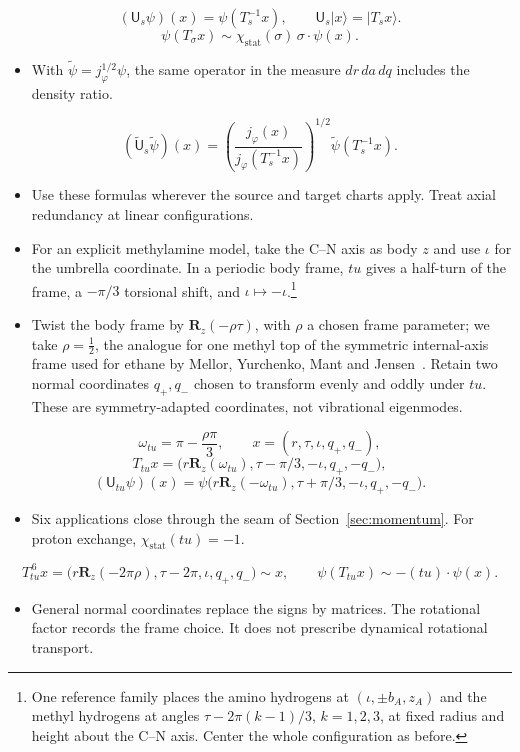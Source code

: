 \documentclass[12pt]{article}
\newcommand{\act}{\mathbin{\cdot}}
\newcommand{\stat}{\chi_{\mathrm{stat}}}
\newcommand{\Rmat}{\mathbf{R}}              %
\newcommand{\Uop}[1]{\mathsf{U}_{#1}}       %
\newcommand{\jdens}{j_\varphi}              %
\begin{document}
\[
(\Uop{s}\psi)(x)=\psi(T_s^{-1}x),\qquad \Uop{s}|x\rangle=|T_sx\rangle.
\]
\[
\psi(T_\sigma x)\sim\stat(\sigma)\,\sigma\act\psi(x).
\]
\begin{itemize}
\item With $\widetilde\psi=\jdens^{1/2}\psi$, the same operator in
the measure $dr\,da\,dq$ includes the density ratio.
\end{itemize}
\[
(\widetilde{\mathsf U}_s\widetilde\psi)(x)
=\left(\frac{\jdens(x)}{\jdens(T_s^{-1}x)}\right)^{1/2}
\widetilde\psi(T_s^{-1}x).
\]
\begin{itemize}
\item Use these formulas wherever the source and target charts apply.
Treat axial redundancy at linear configurations.
\end{itemize}

\begin{itemize}
\item For an explicit methylamine model, take the C--N axis as body $z$
and use $\iota$ for the umbrella coordinate. In a periodic body frame,
$tu$ gives a half-turn of the frame, a $-\pi/3$ torsional shift,
and $\iota\mapsto-\iota$.\footnote{One reference family places the amino
hydrogens at $(\iota,\pm b_A,z_A)$ and the methyl hydrogens at angles
$\tau-2\pi(k-1)/3$, $k=1,2,3$, at fixed radius and height about
the C--N axis. Center the whole configuration as before.}
\item Twist the body frame by $\Rmat_z(-\rho\tau)$, with $\rho$ a chosen
frame parameter; we take $\rho=\tfrac12$, the analogue for one methyl top of
the symmetric internal-axis frame used for ethane by Mellor, Yurchenko, Mant
and Jensen~\cite{MellorEtAl2019}. Retain two normal
coordinates $q_+,q_-$ chosen to transform evenly and oddly under $tu$.
These are symmetry-adapted coordinates, not vibrational eigenmodes.
\end{itemize}
\[
\omega_{tu}=\pi-\frac{\rho\pi}{3},\qquad
x=(r,\tau,\iota,q_+,q_-),
\]
\[
T_{tu}x=\bigl(r\Rmat_z(\omega_{tu}),\tau-\pi/3,-\iota,q_+,-q_-\bigr),
\]
\[
(\Uop{tu}\psi)(x)
=\psi\bigl(r\Rmat_z(-\omega_{tu}),\tau+\pi/3,-\iota,q_+,-q_-\bigr).
\]
\begin{itemize}
\item Six applications close through the seam of Section~\ref{sec:momentum}.
For proton exchange, $\stat(tu)=-1$.
\end{itemize}
\[
T_{tu}^{\,6}x
=\bigl(r\Rmat_z(-2\pi\rho),\tau-2\pi,\iota,q_+,q_-\bigr)\sim x,
\qquad \psi(T_{tu}x)\sim-(tu)\act\psi(x).
\]
\begin{itemize}
\item General normal coordinates replace the signs by matrices.
The rotational factor records the frame choice. It does not prescribe
dynamical rotational transport.
\end{itemize}
\end{document}

